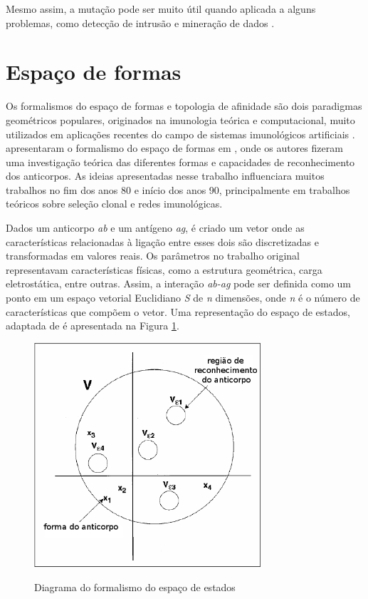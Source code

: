 Mesmo assim, a mutação pode ser muito útil quando aplicada a alguns problemas, como detecção de intrusão e mineração de dados \cite{DeCastro2002}. 

\section{Espaço de formas}

Os formalismos do espaço de formas e topologia de afinidade são dois paradigmas geométricos populares, originados na imunologia teórica e computacional, muito utilizados em aplicações recentes do campo de sistemas imunológicos artificiais \cite{Brownlee2007}. \citeauthor{Perelson1979} apresentaram o formalismo do espaço de formas em \citet{Perelson1979}, onde os autores fizeram uma investigação teórica das diferentes formas e capacidades de reconhecimento dos anticorpos. As ideias apresentadas nesse trabalho influenciara muitos trabalhos no fim dos anos 80 e início dos anos 90, principalmente em trabalhos teóricos sobre seleção clonal e redes imunológicas.

Dados um anticorpo \emph{ab} e um antígeno \emph{ag}, é criado um vetor onde as características relacionadas à ligação entre esses dois são discretizadas e transformadas em valores reais. Os parâmetros no trabalho original representavam características físicas, como a estrutura geométrica, carga eletrostática, entre outras. Assim, a interação \emph{ab-ag} pode ser definida como um ponto em um espaço vetorial Euclidiano \emph{S} de \emph{n} dimensões, onde \emph{n} é o número de características que compõem o vetor. Uma representação do espaço de estados, adaptada de \citet{Brownlee2007} é apresentada na Figura \ref{img:space}.

\begin{figure}[h!]
    \centering
    \caption{Diagrama do formalismo do espaço de estados \cite{Brownlee2007}}
    \includegraphics[width=0.75\textwidth]{img/space.png}
    \label{img:space}
\end{figure}

